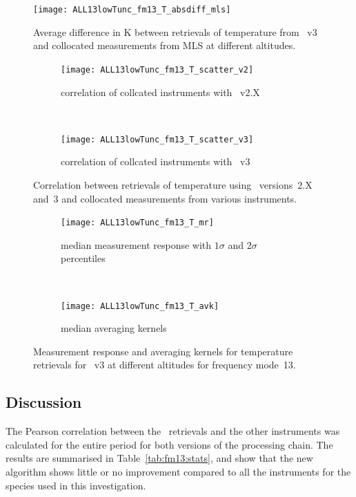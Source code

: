 \begin{figure}[tbhp]
    \centering
    \texttt{[image: ALL13lowTunc\_fm13\_T\_absdiff\_mls]}
    \caption{Average difference in K between retrievals of temperature from
    \smr~v3 and collocated measurements from MLS at different altitudes.}
    \label{fig:fm13:T:profiles}
        \label{fig:fm13:T:profiles:MLS}
\end{figure}

\begin{figure}[tbhp]
    \centering
    \begin{subfigure}[b]{0.49\textwidth}
        \texttt{[image: ALL13lowTunc\_fm13\_T\_scatter\_v2]}
        \caption{correlation of collcated instruments with \smr~v2.X}
        \label{fig:fm13:T:scatter:v2}
    \end{subfigure}
    \,
    \begin{subfigure}[b]{0.49\textwidth}
        \texttt{[image: ALL13lowTunc\_fm13\_T\_scatter\_v3]}
        \caption{correlation of collcated instruments with \smr~v3}
        \label{fig:fm13:T:scatter:v3}
    \end{subfigure}
    \caption{Correlation between retrievals of temperature using \smr\
    versions~2.X and~3 and collocated measurements from various instruments.}
    \label{fig:fm13:T:scatter}
\end{figure}

\begin{figure}[tbhp]
    \centering
    \begin{subfigure}[b]{0.49\textwidth}
        \texttt{[image: ALL13lowTunc\_fm13\_T\_mr]}
        \caption{median measurement response with $1\sigma$ and $2\sigma$
        percentiles}
        \label{fig:fm13:T:mr}
    \end{subfigure}
    \,
    \begin{subfigure}[b]{0.49\textwidth}
        \texttt{[image: ALL13lowTunc\_fm13\_T\_avk]}
        \caption{median averaging kernels\newline~}
        \label{fig:fm13:T:avk}
    \end{subfigure}
    \caption{Measurement response and averaging kernels for temperature
    retrievals for \smr~v3 at different altitudes for frequency mode~13.}
    \label{fig:fm13:T:mr_avk}
\end{figure}


\subsection{Discussion}
\label{sec:fm13:discussion}
The Pearson correlation between the \smr\ retrievals and the other instruments
was calculated for the entire period for both versions of the processing chain.
The results are summarised in Table~\ref{tab:fm13:stats}, and show that the
new algorithm shows little or no improvement compared to all the instruments
for the species used in this investigation.


